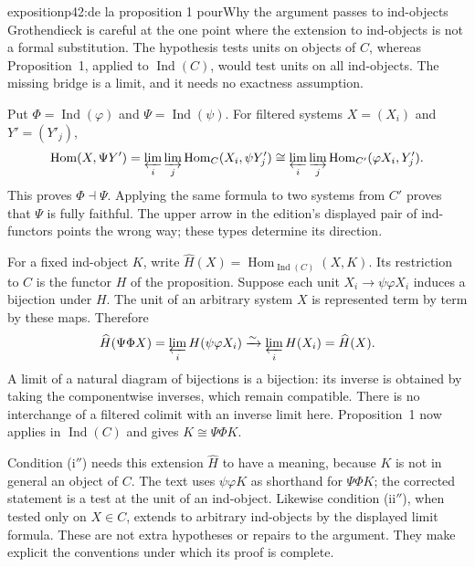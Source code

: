 \begin{dcomment}{exposition}{p42:de la proposition 1 pour}{Why the argument passes to ind-objects}
Grothendieck is careful at the one point where the extension to ind-objects is not a formal substitution. The hypothesis tests units on objects of $C$, whereas Proposition~1, applied to $\operatorname{Ind}(C)$, would test units on all ind-objects. The missing bridge is a limit, and it needs no exactness assumption.

Put $\Phi=\operatorname{Ind}(\varphi)$ and $\Psi=\operatorname{Ind}(\psi)$. For filtered systems $X=(X_i)$ and $Y'=(Y'_j)$,
\[
 \operatorname{Hom}(X,\Psi Y')
  =\varprojlim_i\varinjlim_j\operatorname{Hom}_C(X_i,\psi Y'_j)
  \cong\varprojlim_i\varinjlim_j
        \operatorname{Hom}_{C'}(\varphi X_i,Y'_j).
\]
This proves $\Phi\dashv\Psi$. Applying the same formula to two systems from $C'$ proves that $\Psi$ is fully faithful. The upper arrow in the edition's displayed pair of ind-functors points the wrong way; these types determine its direction.

For a fixed ind-object $K$, write $\widehat H(X)=\operatorname{Hom}_{\operatorname{Ind}(C)}(X,K)$. Its restriction to $C$ is the functor $H$ of the proposition. Suppose each unit $X_i\to\psi\varphi X_i$ induces a bijection under $H$. The unit of an arbitrary system $X$ is represented term by term by these maps. Therefore
\[
 \widehat H(\Psi\Phi X)=\varprojlim_i H(\psi\varphi X_i)
   \xrightarrow{\sim}\varprojlim_i H(X_i)=\widehat H(X).
\]
A limit of a natural diagram of bijections is a bijection: its inverse is obtained by taking the componentwise inverses, which remain compatible. There is no interchange of a filtered colimit with an inverse limit here. Proposition~1 now applies in $\operatorname{Ind}(C)$ and gives $K\cong\Psi\Phi K$.

Condition (i$''$) needs this extension $\widehat H$ to have a meaning, because $K$ is not in general an object of $C$. The text uses $\psi\varphi K$ as shorthand for $\Psi\Phi K$; the corrected statement is a test at the unit of an ind-object. Likewise condition (ii$''$), when tested only on $X\in C$, extends to arbitrary ind-objects by the displayed limit formula. These are not extra hypotheses or repairs to the argument. They make explicit the conventions under which its proof is complete.
\end{dcomment}

